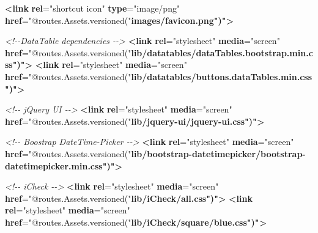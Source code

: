 \documentclass[
  11pt,
]{krantz}
\newenvironment{Shaded}{\begin{snugshade}}{\end{snugshade}}
\newcommand{\CommentTok}[1]{\textcolor[rgb]{0.37,0.37,0.37}{\textit{#1}}}
\newcommand{\ErrorTok}[1]{\textcolor[rgb]{0.14,0.14,0.14}{\textbf{#1}}}
\newcommand{\KeywordTok}[1]{\textcolor[rgb]{0.27,0.27,0.27}{\textbf{#1}}}
\newcommand{\OtherTok}[1]{\textcolor[rgb]{0.37,0.37,0.37}{#1}}
\newcommand{\StringTok}[1]{\textcolor[rgb]{0.5,0.5,0.5}{#1}}
\begin{document}
\begin{Shaded}
\begin{Highlighting}[]
    \KeywordTok{\textless{}link} \ErrorTok{rel}\OtherTok{=}\StringTok{"shortcut icon"} \ErrorTok{type}\OtherTok{=}\StringTok{"image/png"} \ErrorTok{href}\OtherTok{=}\StringTok{"@routes.Assets.versioned("}\ErrorTok{images/favicon.png")"}\KeywordTok{\textgreater{}}

    \CommentTok{\textless{}!{-}{-}DataTable dependencies {-}{-}\textgreater{}}
    \KeywordTok{\textless{}link} \ErrorTok{rel}\OtherTok{=}\StringTok{"stylesheet"} \ErrorTok{media}\OtherTok{=}\StringTok{"screen"} \ErrorTok{href}\OtherTok{=}\StringTok{"@routes.Assets.versioned("}\ErrorTok{lib/datatables/dataTables.bootstrap.min.css")"}\KeywordTok{\textgreater{}}
    \KeywordTok{\textless{}link} \ErrorTok{rel}\OtherTok{=}\StringTok{"stylesheet"} \ErrorTok{media}\OtherTok{=}\StringTok{"screen"} \ErrorTok{href}\OtherTok{=}\StringTok{"@routes.Assets.versioned("}\ErrorTok{lib/datatables/buttons.dataTables.min.css")"}\KeywordTok{\textgreater{}}

    \CommentTok{\textless{}!{-}{-} jQuery UI {-}{-}\textgreater{}}
    \KeywordTok{\textless{}link} \ErrorTok{rel}\OtherTok{=}\StringTok{"stylesheet"} \ErrorTok{media}\OtherTok{=}\StringTok{"screen"} \ErrorTok{href}\OtherTok{=}\StringTok{"@routes.Assets.versioned("}\ErrorTok{lib/jquery{-}ui/jquery{-}ui.css")"}\KeywordTok{\textgreater{}}

    \CommentTok{\textless{}!{-}{-} Boostrap DateTime{-}Picker {-}{-}\textgreater{}}
    \KeywordTok{\textless{}link} \ErrorTok{rel}\OtherTok{=}\StringTok{"stylesheet"} \ErrorTok{media}\OtherTok{=}\StringTok{"screen"} \ErrorTok{href}\OtherTok{=}\StringTok{"@routes.Assets.versioned("}\ErrorTok{lib/bootstrap{-}datetimepicker/bootstrap{-}datetimepicker.min.css")"}\KeywordTok{\textgreater{}}

    \CommentTok{\textless{}!{-}{-} iCheck {-}{-}\textgreater{}}
    \KeywordTok{\textless{}link} \ErrorTok{rel}\OtherTok{=}\StringTok{"stylesheet"} \ErrorTok{media}\OtherTok{=}\StringTok{"screen"} \ErrorTok{href}\OtherTok{=}\StringTok{"@routes.Assets.versioned("}\ErrorTok{lib/iCheck/all.css")"}\KeywordTok{\textgreater{}}
    \KeywordTok{\textless{}link} \ErrorTok{rel}\OtherTok{=}\StringTok{"stylesheet"} \ErrorTok{media}\OtherTok{=}\StringTok{"screen"} \ErrorTok{href}\OtherTok{=}\StringTok{"@routes.Assets.versioned("}\ErrorTok{lib/iCheck/square/blue.css")"}\KeywordTok{\textgreater{}}


\end{Highlighting}
\end{Shaded}
\end{document}
